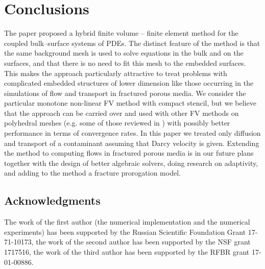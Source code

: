 \documentclass{article}
\begin{document}
{\section{Conclusions} \label{s_concl} The paper proposed a hybrid finite volume -- finite element method for the coupled bulk--surface systems of PDEs. The distinct feature of the method is that the same background mesh is used to solve equations in the bulk and on the surfaces, and that there is no need to fit this mesh to the embedded surfaces. This makes the approach particularly attractive to treat problems with complicated embedded structures of lower dimension like those occurring in the simulations of flow and transport in fractured porous media. We consider the particular monotone non-linear FV method with compact stencil, but we believe that the approach can be carried over and used with other FV methods on polyhedral meshes (e.g. some of those reviewed in \cite{Droniou:14}) with possibly better performance in terms of convergence rates. In this paper we treated only diffusion and transport of a contaminant assuming that Darcy velocity is given. Extending the method to computing flows in fractured porous media is in our future plans together with the design of better algebraic solvers, doing research on adaptivity, and adding to the method a fracture prorogation model.

}

\subsection*{Acknowledgments}
The work of the first author (the numerical implementation and the numerical experiments) has been supported  by the Russian Scientific Foundation Grant 17-71-10173, the work of the second author has been supported by the NSF grant 1717516, the work of the third author has been supported by the RFBR grant 17-01-00886.



\end{document}
